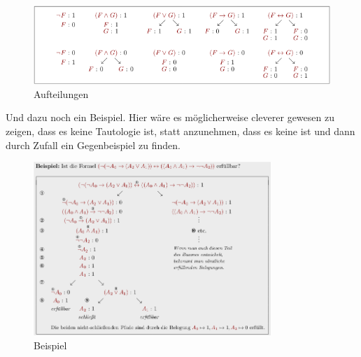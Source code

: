 \documentclass[a4paper]{scrartcl}
\begin{document}
    \begin{figure}[H]
        \centering
        \includegraphics[scale=0.6]{Baumkalkuel.png}
        \caption{Aufteilungen}
        \label{fig:}
    \end{figure}

    Und dazu noch ein Beispiel. Hier wäre es möglicherweise cleverer gewesen zu zeigen, dass es keine Tautologie ist, statt anzunehmen, dass es keine ist und dann durch Zufall ein Gegenbeispiel zu finden.

    \begin{figure}[H]
        \centering
        \includegraphics[width=0.8\textwidth, height=0.34\textheight]{Baumkalkuel-2.png}
        \caption{Beispiel}
        \label{fig:}
    \end{figure}
\end{document}
